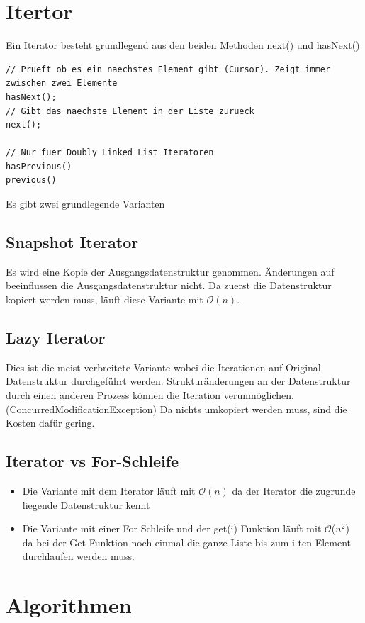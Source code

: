 \section{Itertor}
Ein Iterator besteht grundlegend aus den beiden Methoden next() und hasNext()
\begin{lstlisting}
// Prueft ob es ein naechstes Element gibt (Cursor). Zeigt immer zwischen zwei Elemente
hasNext();
// Gibt das naechste Element in der Liste zurueck
next();

// Nur fuer Doubly Linked List Iteratoren
hasPrevious()
previous()
\end{lstlisting}


Es gibt zwei grundlegende Varianten
\subsection{Snapshot Iterator}
Es wird eine Kopie der Ausgangsdatenstruktur genommen. Änderungen auf beeinflussen die Ausgangsdatenstruktur nicht. Da zuerst die Datenstruktur kopiert werden muss, läuft diese Variante mit $\mathcal{O}(n)$. 

\subsection{Lazy Iterator}
Dies ist die meist verbreitete Variante wobei die Iterationen auf Original Datenstruktur durchgeführt werden. Strukturänderungen an der Datenstruktur durch einen anderen Prozess können die Iteration verunmöglichen. (ConcurredModificationException) Da nichts umkopiert werden muss, sind die Kosten dafür gering.

\subsection{Iterator vs For-Schleife}
\begin{itemize}
	\item Die Variante mit dem Iterator läuft mit $\mathcal{O}(n)$ da der Iterator die zugrunde liegende Datenstruktur kennt
	\item Die Variante mit einer For Schleife und der get(i) Funktion läuft mit $\mathcal{O}$($n^2$) da bei der Get Funktion noch einmal die ganze Liste bis zum i-ten Element durchlaufen werden muss.
\end{itemize}



\section{Algorithmen}
